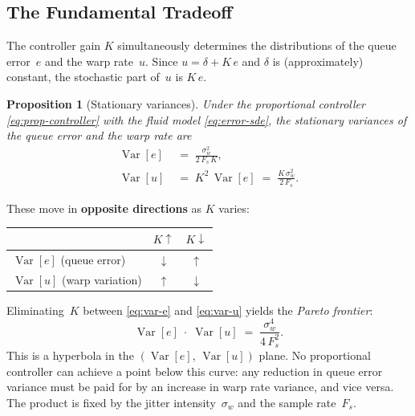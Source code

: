 \documentclass[11pt, a4paper]{article}
\theoremstyle{definition}
\theoremstyle{plain}
\newtheorem{proposition}[theorem]{Proposition}
\theoremstyle{remark}
\newcommand{\Var}{\operatorname{Var}}
\begin{document}
\subsection{The Fundamental Tradeoff}\label{sec:tradeoff}

The controller gain $K$ simultaneously determines the distributions
of the queue error~$e$ and the warp rate~$u$.  Since
$u = \delta + K\,e$ and $\delta$ is (approximately) constant,
the stochastic part of~$u$ is $K\,e$.

\begin{proposition}[Stationary variances]\label{prop:variances}
  Under the proportional controller \eqref{eq:prop-controller}
  with the fluid model \eqref{eq:error-sde}, the stationary
  variances of the queue error and the warp rate are
  \begin{align}
    \Var[e] &\;=\; \frac{\sigma_w^2}{2\,F_s\,K},
      \label{eq:var-e} \\[6pt]
    \Var[u] &\;=\; K^2\,\Var[e]
             \;=\; \frac{K\,\sigma_w^2}{2\,F_s}.
      \label{eq:var-u}
  \end{align}
\end{proposition}

These move in \textbf{opposite directions} as $K$ varies:
\begin{center}
\begin{tabular}{@{}lcc@{}}
  \toprule
  & $K \uparrow$ & $K \downarrow$ \\
  \midrule
  $\Var[e]$ (queue error) & $\downarrow$ & $\uparrow$ \\
  $\Var[u]$ (warp variation) & $\uparrow$ & $\downarrow$ \\
  \bottomrule
\end{tabular}
\end{center}

\noindent
Eliminating~$K$ between \eqref{eq:var-e} and \eqref{eq:var-u} yields
the \emph{Pareto frontier}:
\begin{equation}\label{eq:pareto}
  \boxed{\;\Var[e] \;\cdot\; \Var[u]
    \;=\; \frac{\sigma_w^4}{4\,F_s^2}.\;}
\end{equation}
This is a hyperbola in the $(\Var[e],\,\Var[u])$ plane.  No
proportional controller can achieve a point below this curve: any
reduction in queue error variance must be paid for by an increase in
warp rate variance, and vice versa.  The product is fixed by the
jitter intensity~$\sigma_w$ and the sample rate~$F_s$.
\end{document}
